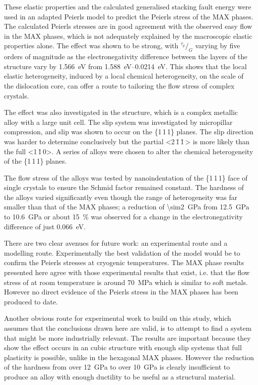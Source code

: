 These elastic properties and the calculated generalised stacking fault energy were used in an adapted Peierls model to predict the Peierls stress of the MAX phases. The calculated Peierls stresses are in good agreement with the observed easy flow in the MAX phases, which is not adequately explained by the macroscopic elastic properties alone. The effect was shown to be strong, with $^{\tau_p}\!/_{G}$ varying by five orders of magnitude as the electronegativity difference between the layers of the structure vary by \SI{1.566}{\electronvolt} from \SIrange{1.588}{0.0214}{\electronvolt}. This shows that the local elastic heterogeneity, induced by a local chemical heterogeneity, on the scale of the dislocation core, can offer a route to tailoring the flow stress of complex crystals.

The effect was also investigated in the  structure, which is a complex metallic alloy with a large unit cell. The slip system was investigated by micropillar compression, and slip was shown to occur on the \{1\,1\,1\} planes. The slip direction was harder to determine conclusively but the partial <2\,\={1}\,\={1}\,> is more likely than the full <1\,\={1}\,0>. A series of alloys were chosen to alter the chemical heterogeneity of the  \{1\,1\,1\} planes. 

The flow stress of the alloys was tested by nanoindentation of the \{1\,1\,1\} face of single crystals to ensure the Schmid factor remained constant. The hardness of the alloys varied significantly even though the range of heterogeneity was far smaller than that of the MAX phases; a reduction of \SI{\sim2}{\giga\pascal} from \SI{12.5}{\giga\pascal} to \SI{10.6}{\giga\pascal} or about \SI{15}{\percent} was observed for a change in the electronegativity difference of just \SI{0.066}{\electronvolt}.



There are two clear avenues for future work: an experimental route and a modelling route. Experimentally the best validation of the model would be to confirm the Peierls stresses at cryogenic temperatures. The MAX phase results presented here agree with those experimental results that exist, i.e. that the flow stress of  at room temperature is around \SI{70}{\mega\pascal} which is similar to soft metals. However no direct evidence of the Peierls stress in the MAX phases has been produced to date.

Another obvious route for experimental work to build on this study, which assumes that the conclusions drawn here are valid, is to attempt to find a system that might be more industrially relevant. The  results are important because they show the effect occurs in an cubic structure with enough slip systems that full plasticity is possible, unlike in the hexagonal MAX phases. However the reduction of the hardness from over \SI{12}{\giga\pascal} to over \SI{10}{\giga\pascal} is clearly insufficient to produce an alloy with enough ductility to be useful as a structural material.

